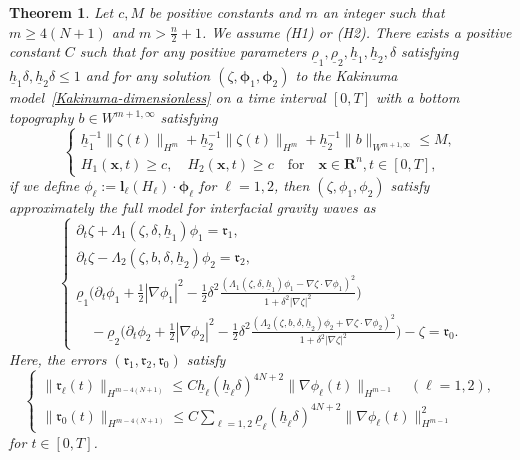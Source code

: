 \documentclass[11pt,leqno]{article}
\newtheorem{theorem}{\bf Theorem}[section]
\numberwithin{equation}{section}
\numberwithin{figure}{section}
\begin{document}
\begin{theorem}\label{theorem-consistency1}
Let $c, M$ be positive constants and $m$ an integer such that $m \geq 4(N+1)$ and $m>\frac{n}{2}+1$. 
We assume {\rm (H1)} or {\rm (H2)}. 
There exists a positive constant $C$ such that for any positive parameters $\underline{\rho}_1, \underline{\rho}_2, \underline{h}_1, \underline{h}_2, \delta$ satisfying 
$\underline{h}_1\delta, \underline{h}_2\delta \leq 1$ and for any solution $(\zeta,\bm{\phi}_1,\bm{\phi}_2)$ to the Kakinuma model~\eqref{Kakinuma-dimensionless} 
on a time interval $[0,T]$ with a bottom topography $b\in W^{m+1,\infty}$ satisfying 
%
\begin{equation}\label{cond.consisitency}
\begin{cases}
 \underline{h}_1^{-1}\|\zeta(t)\|_{H^m} + \underline{h}_2^{-1}\|\zeta(t)\|_{H^m}
  + \underline{h}_2^{-1}\|b\|_{W^{m+1,\infty}} \leq M, \\
 H_1(\bm{x},t)\geq c, \quad H_2(\bm{x},t)\geq c \quad\mbox{for}\quad \bm{x}\in\mathbf{R}^n, t\in[0,T],
\end{cases}
\end{equation}
%
if we define $\phi_\ell:=\bm{l}_\ell(H_\ell)\cdot\bm{\phi}_\ell$ for $\ell=1,2$, then $(\zeta,\phi_1,\phi_2)$ 
satisfy approximately the full model for interfacial gravity waves as 
%
\[
\begin{cases}
\partial_t\zeta + \Lambda_1(\zeta,\delta,\underline{h}_1)\phi_1=\mathfrak{r}_1,\\
\partial_t\zeta - \Lambda_2(\zeta,b,\delta,\underline{h}_2)\phi_2 =\mathfrak{r}_2,\\
\displaystyle
\underline{\rho}_1\biggl( \partial_t\phi_1 + \frac12|\nabla\phi_1|^2
 - \frac12\delta^2 \frac{(\Lambda_1(\zeta,\delta,\underline{h}_1)\phi_1
  - \nabla\zeta \cdot \nabla\phi_1 )^2}{1+\delta^2|\nabla\zeta|^2} \biggr) \\
\displaystyle\quad
 - \underline{\rho}_2\biggl( \partial_t\phi_2 + \frac12|\nabla\phi_2|^2
  - \frac12\delta^2 \frac{(\Lambda_2(\zeta,b,\delta,\underline{h}_2)\phi_2
   + \nabla\zeta \cdot \nabla\phi_2 )^2}{1+\delta^2|\nabla\zeta|^2} \biggr)
 - \zeta = \mathfrak{r}_0.
\end{cases}
\]
%
Here, the errors $(\mathfrak{r}_1,\mathfrak{r}_2,\mathfrak{r}_0)$ satisfy 
%
\[
\begin{cases}
 \|\mathfrak{r}_\ell(t)\|_{H^{m-4(N+1)}}
  \leq C\underline{h}_\ell(\underline{h}_\ell\delta)^{4N+2}\|\nabla\phi_\ell(t)\|_{H^{m-1}}
  \quad (\ell=1,2), \\
 \displaystyle
 \|\mathfrak{r}_0(t)\|_{H^{m-4(N+1)}} \leq 
  C\sum_{\ell=1,2}\underline{\rho}_\ell(\underline{h}_\ell\delta)^{4N+2}\|\nabla\phi_\ell(t)\|_{H^{m-1}}^2
\end{cases}
\]
%
for $t\in[0,T]$. 
\end{theorem}
\end{document}
